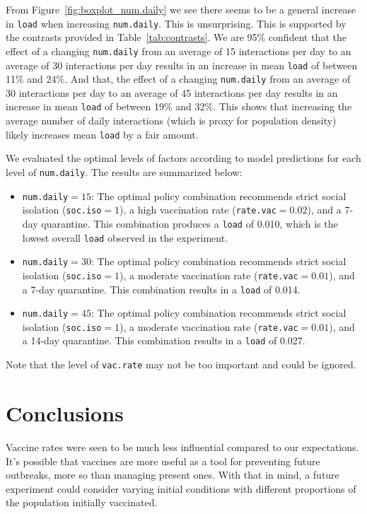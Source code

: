\documentclass[12pt,a4paper]{article}
\begin{document}
From Figure~\ref{fig:boxplot_num.daily} we see there seems to be a general increase in \verb`load` when increasing  \verb`num.daily`. This is unsurprising. This is supported by the contrasts provided in Table~\ref{tab:contrasts}. We are 95\% confident that the effect of a changing \verb`num.daily` from an average of 15 interactions per day to an average of 30 interactions per day results in an increase in mean \verb`load` of between 11\% and 24\%. And that, the effect of a changing \verb`num.daily` from an average of 30 interactions per day to an average of 45 interactions per day results in an increase in mean \verb`load` of between 19\% and 32\%. This shows that increasing the average number of daily interactions (which is proxy for population density) likely increases mean \verb`load` by a fair amount.

We evaluated the optimal levels of factors according to model predictions for each level of \verb`num.daily`. The results are summarized below:
\begin{itemize}
	\item \verb`num.daily`$=15$: The optimal policy combination recommends strict social isolation (\verb'soc.iso'$=1$), a high vaccination rate (\verb'rate.vac'$=0.02$), and a 7-day quarantine. This combination produces a \verb`load` of 0.010, which is the lowest overall \verb`load` observed in the experiment.
	\item \verb`num.daily`$=30$: The optimal policy combination recommends strict social isolation (\verb`soc.iso`$=1$), a moderate vaccination rate (\verb`rate.vac`$= 0.01$), and a 7-day quarantine. This combination results in a \verb`load` of 0.014.
	\item \verb`num.daily`$= 45$: The optimal policy combination recommends strict social isolation (\verb`soc.iso`$= 1$), a moderate vaccination rate (\verb`rate.vac`$=0.01$), and a 14-day quarantine. This combination results in a \verb`load` of 0.027.
\end{itemize}
Note that the level of \verb`vac.rate` may not be too important and could be ignored.



\section{Conclusions}\label{section4}

Vaccine rates were seen to be much less influential compared to our expectations. It's possible that vaccines are more useful as a tool for preventing future outbreaks, more so than managing present ones. With that in mind, a future experiment could consider varying initial conditions with different proportions of the population initially vaccinated.
\end{document}

